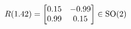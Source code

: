 \documentclass[preview]{standalone}
\begin{document}
\begin{align*}
\special{dvisvgm:raw <g id='unique000'>}R(1.42) = \begin{bmatrix} 0.15 & -0.99 \\ 0.99 & 0.15 \end{bmatrix} \in \text{SO}(2)\special{dvisvgm:raw </g>}
\end{align*}
\end{document}
